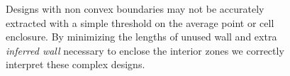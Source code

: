 \begin{figure}[t]
\caption{Designs with non convex boundaries may not be accurately
  extracted with a simple threshold on the average point or cell
  enclosure.  By minimizing the lengths of unused wall and extra {\em
    inferred wall} necessary to enclose the interior zones we 
  correctly interpret these complex designs.}
\label{figure:nonconvex}
\end{figure}

